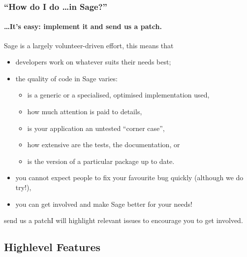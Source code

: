 \documentclass[9pt]{beamer}
\newcommand{\patchit}[1]{\begin{block}{send us a patch}#1\end{block}}
\begin{document}
\begin{frame}
\frametitle{``How do I do \dots in Sage?''}
\framesubtitle{\hfill \dots It's easy: implement it and send us a patch.}

Sage is a largely volunteer-driven effort, this means that
\begin{itemize}
 \item developers work on whatever suits their needs best;
 \item the quality of code in Sage varies:
 \begin{itemize}
   \item is a generic or a specialised, optimised implementation used,
   \item how much attention is paid to details,
   \item is your application an untested ``corner case'',
   \item how extensive are the tests, the documentation, or
   \item is the version of a particular package up to date.
 \end{itemize}
 \item you cannot expect people to fix your favourite bug quickly (although we do try!),
 \item you can get involved and make Sage better for your needs!
\end{itemize}

\patchit{I will highlight relevant issues to encourage you to get involved.}
\end{frame}

\subsection{Highlevel Features}
\end{document}
